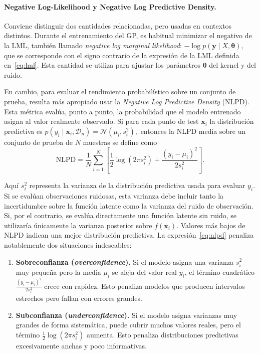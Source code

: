 \paragraph{Negative Log-Likelihood y Negative Log Predictive Density.}

Conviene distinguir dos cantidades relacionadas, pero usadas en contextos distintos. Durante
el entrenamiento del GP, es habitual minimizar el negativo de la LML,
también llamado \emph{negative log marginal likelihood}:
\(
-\log p(\bm{y}\mid X,\bm{\theta}),
\)
que se corresponde con el signo contrario de la expresión de la LML
definida en~\eqref{eq:lml}. Esta cantidad se utiliza para ajustar los parámetros
\(\bm{\theta}\) del kernel y del ruido.

En cambio, para evaluar el rendimiento probabilístico sobre un conjunto de prueba, resulta
más apropiado usar la \emph{Negative Log Predictive Density} (NLPD). Esta métrica evalúa,
punto a punto, la probabilidad que el modelo entrenado asigna al valor realmente observado.
Si para cada punto de test \(\bm{x}_i\) la distribución predictiva es
\(
p(y_i\mid \bm{x}_i,\mathcal{D}_n)=\mathcal{N}(\mu_i,s_i^2),
\)
entonces la NLPD media sobre un conjunto de prueba de \(N\) muestras se define como
\begin{equation}
\mathrm{NLPD}
=
\frac{1}{N}
\sum_{i=1}^{N}
\left[
\frac{1}{2}\log(2\pi s_i^2)
+
\frac{(y_i-\mu_i)^2}{2s_i^2}
\right].
\label{eq:nlpd}
\end{equation}

Aquí \(s_i^2\) representa la varianza de la distribución predictiva usada para evaluar
\(y_i\). Si se evalúan observaciones ruidosas, esta varianza debe incluir tanto la incertidumbre
sobre la función latente como la varianza del ruido de observación. Si, por el contrario, se
evalúa directamente una función latente sin ruido, se utilizaría únicamente la varianza
posterior sobre \(f(\bm{x}_i)\).
Valores más bajos de NLPD indican una mejor distribución predictiva. La
expresión~\eqref{eq:nlpd} penaliza notablemente dos situaciones indeseables:

\begin{enumerate}
    \item \textbf{Sobreconfianza (\emph{overconfidence}).} Si el modelo asigna una varianza
    \(s_i^2\) muy pequeña pero la media \(\mu_i\) se aleja del valor real \(y_i\), el término
    cuadrático
    \(
    \frac{(y_i-\mu_i)^2}{2s_i^2}
    \)
    crece con rapidez. Esto penaliza modelos que producen intervalos estrechos pero fallan
    con errores grandes.

    \item \textbf{Subconfianza (\emph{underconfidence}).} Si el modelo asigna varianzas muy
    grandes de forma sistemática, puede cubrir muchos valores reales, pero el término
    \(
    \frac{1}{2}\log(2\pi s_i^2)
    \)
    aumenta. Esto penaliza distribuciones predictivas excesivamente anchas y poco
    informativas.
\end{enumerate}

